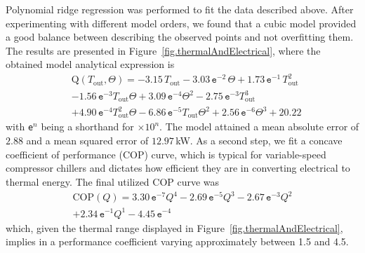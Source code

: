 Polynomial ridge regression was performed to fit the data described above. After experimenting with different model orders, we found that a cubic model provided a good balance between describing the observed points and not overfitting them. The results are presented in Figure~\ref{fig.thermalAndElectrical}, where the obtained model analytical expression is
\begin{align}
	&\text{Q}(T_\text{out},\Theta) = -3.15 \, T_\text{out} - 3.03 \,\texttt{e}^{-2} \, \Theta + 1.73\,\texttt{e}^{-1} \, T_\text{out}^2 \nonumber \\
	&- 1.56\,\texttt{e}^{-3} T_\text{out} \Theta + 3.09\,\texttt{e}^{-4} \Theta^2 - 2.75\,\texttt{e}^{-3} T_\text{out}^3 \label{eq.thermalEnergy} \\
	&+ 4.90 \,\texttt{e}^{-4} T_\text{out}^2 \Theta - 6.86 \,\texttt{e}^{-5} T_\text{out} \Theta^2 + 2.56 \,\texttt{e}^{-6}\Theta^3 + 20.22 \nonumber
\end{align}
with \texttt{e}$^{n}$ being a shorthand for $\times10^{n}$. The model attained a mean absolute error of $2.88$ and a mean squared error of $12.97\,$kW. As a second step, we fit a concave coefficient of performance (COP) curve, which is typical for variable-speed compressor chillers and dictates how efficient they are in converting electrical to thermal energy. The final utilized COP curve was
\begin{equation}
	\begin{split}
		\text{COP}(Q) = 3.30 \, \texttt{e}^{-7} Q^4 - 2.69 \, \texttt{e}^{-5} Q^3 - 2.67 \, \texttt{e}^{-3} Q^2 \\ + 2.34 \, \texttt{e}^{-1} Q^1 - 4.45 \, \texttt{e}^{-4}
		\label{eq.COP}
	\end{split}
\end{equation}
which, given the thermal range displayed in Figure~\ref{fig.thermalAndElectrical}, implies in a performance coefficient varying approximately between 1.5 and 4.5.

